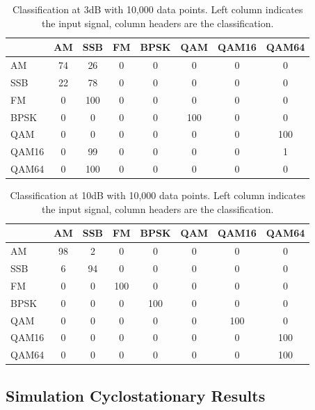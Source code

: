 \begin{table}
\centering
\caption{Classification at 3dB with 10,000 data points.  Left column indicates
the input signal, column headers are the classification.}
\begin{tabular}{ l | c | c | c | c | c | c | c } \hline
      &  AM  &  SSB & FM & BPSK & QAM & QAM16 & QAM64 \\ \hline \hline 
AM    &	 74 &	 26 &	 0 &	 0 &	 0 &	 0 &	 0 \\ \hline  
SSB   &	 22 &	 78 &	 0 &	 0 &	 0 &	 0 &	 0 \\ \hline  
FM    &	 0 &	 100 &	 0 &	 0 &	 0 &	 0 &	 0 \\ \hline  
BPSK  &	 0 &	 0 &	 0 &	 0 &	 100 &	 0 &	 0 \\ \hline  
QAM   &	 0 &	 0 &	 0 &	 0 &	 0 &	 0 &	 100 \\ \hline 
QAM16 &	 0 &	 99 &	 0 &	 0 &	 0 &	 0 &	 1 \\ \hline  
QAM64 &	 0 &	 100 &	 0 &	 0 &	 0 &	 0 &	 0 \\ \hline 
\end{tabular}
\label{tab:cumFalsePosTable3dB}
\end{table}

\begin{table}
\centering
\caption{Classification at 10dB with 10,000 data points.  Left column indicates
the input signal, column headers are the classification.}
\begin{tabular}{ l | c | c | c | c | c | c | c } \hline
      &  AM  &  SSB & FM & BPSK & QAM & QAM16 & QAM64 \\ \hline \hline 
AM    &	 98 &	 2 &	 0 &	 0 &	 0 &	 0 &	 0 \\ \hline \hline 
SSB   &	 6 &	 94 &	 0 &	 0 &	 0 &	 0 &	 0 \\ \hline 
FM    &	 0 &	 0 &	 100 &	 0 &	 0 &	 0 &	 0 \\ \hline  
BPSK  &	 0 &	 0 &	 0 &	 100 &	 0 &	 0 &	 0 \\ \hline  
QAM   &	 0 &	 0 &	 0 &	 0 &	 0 &	 100 &	 0 \\ \hline  
QAM16 &	 0 &	 0 &	 0 &	 0 &	 0 &	 0 &	 100 \\ \hline 
QAM64 &	 0 &	 0 &	 0 &	 0 &	 0 &	 0 &	 100 \\ \hline 
\end{tabular}
\label{tab:cumFalsePosTable10dB}
\end{table}

\newpage
\subsection{Simulation Cyclostationary Results}

